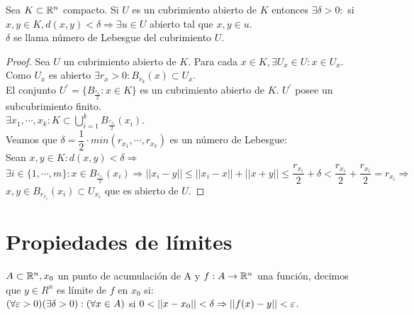 \begin{prop}
  Sea $K \subset \mathbb{R}^n$ compacto. Si $U$ es un cubrimiento abierto de $K$ entonces $\exists \delta > 0 :$ si $x, y \in K, d(x, y) < \delta \Rightarrow \exists u \in U$ abierto tal que $x, y \in u$. \\
  $\delta$ se llama número de Lebesgue del cubrimiento $U$.
  \begin{proof}
    Sea $U$ un cubrimiento abierto de $K$. Para cada $x \in K, \exists U_x \in U : x \in U_x$. Como $U_x$ es abierto $\exists r_x > 0 : B_{r_k}(x) \subset U_x$. \\
    El conjunto $U^{\prime} = \{ B_{\frac{r_x}{2}} : x \in K \}$ es un cubrimiento abierto de $K$. $U^{\prime}$ posee un subcubrimiento finito. \\
    $\exists x_1, \cdots, x_k : K \subset \bigcup_{i = 1}^{k} B_{\frac{r_{x_i}}{2}}(x_i)$. \\
    Veamos que $\delta = \dfrac{1}{2} \cdot min(r_{x_1}, \cdots, r_{x_k})$ es un número de Lebesgue: \\
    Sean $x, y \in K : d(x,y) < \delta \Rightarrow$ \\
    $\exists i \in \{1, \cdots, m\} : x \in B_{\frac{r_{x_i}}{2}}(x_i) \Rightarrow ||x_i - y|| \leq ||x_i - x|| + ||x+y|| \leq \dfrac{r_{x_i}}{2} + \delta < \dfrac{r_{x_i}}{2} + \dfrac{r_{x_i}}{2} = r_{x_i} \Rightarrow$ \\
    $x, y \in B_{r_{x_i}}(x_i) \subset U_{x_i}$ que es abierto de $U$.
  \end{proof}
\end{prop}

\section{Propiedades de límites}

\begin{definition}[Límite]
  $A \subset \mathbb{R}^n, x_0$ un punto de acumulación de A y $f: A \to \mathbb{R}^n$ una función, decimos que $y \in R^n$ es límite de $f$ en $x_0$ si: \\
  $(\forall \varepsilon > 0)(\exists \delta>0) : (\forall x \in A)$ si $0 < ||x - x_0|| < \delta \Rightarrow ||f(x) - y|| < \varepsilon$.
\end{definition}

